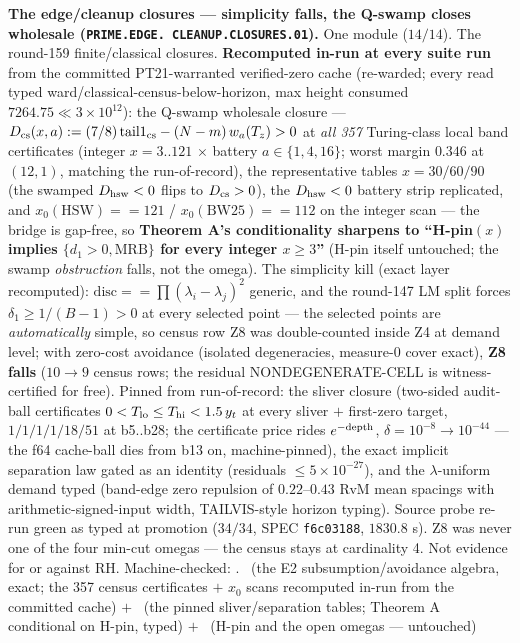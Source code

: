\par\smallskip\noindent\textbf{The edge/cleanup closures ---
simplicity falls, the Q-swamp closes wholesale
(\texttt{PRIME.\allowbreak EDGE.\allowbreak
CLEANUP.\allowbreak CLOSURES.01}).}
One module ($14/14$).  The round-159 finite/classical closures.
\textbf{Recomputed in-run at every suite run} from the committed
PT21-warranted verified-zero cache (re-warded; every read typed
ward/classical-census-below-horizon, max height consumed
$7264.75 \ll 3\times10^{12}$): the Q-swamp wholesale closure ---
$D_{\rm cs}(x, a) := (7/8)\,\mathrm{tail1}_{\rm cs} - (N -
m)\,w_a(T_z) > 0$ at \emph{all 357} Turing-class local band
certificates (integer $x = 3..121$ $\times$ battery $a \in \{1,
4, 16\}$; worst margin $0.346$ at $(12, 1)$, matching the
run-of-record), the representative tables $x = 30/60/90$ (the
swamped $D_{\rm hsw} < 0$ flips to $D_{\rm cs} > 0$), the
$D_{\rm hsw} < 0$ battery strip replicated, and $x_0(\mathrm{HSW})
== 121$ / $x_0(\mathrm{BW25}) == 112$ on the integer scan ---
the bridge is gap-free, so \textbf{Theorem A's conditionality
sharpens to ``H-pin$(x)$ implies $\{d_1 > 0, \mathrm{MRB}\}$ for
every integer $x \ge 3$''} (H-pin itself untouched; the swamp
\emph{obstruction} falls, not the omega).  The simplicity kill
(exact layer recomputed): $\mathrm{disc} == \prod(\lambda_i -
\lambda_j)^2$ generic, and the round-147 LM split forces
$\delta_1 \ge 1/(B-1) > 0$ at every selected point --- the
selected points are \emph{automatically} simple, so census row
Z8 was double-counted inside Z4 at demand level; with zero-cost
avoidance (isolated degeneracies, measure-0 cover exact),
\textbf{Z8 falls} ($10 \to 9$ census rows; the residual
NONDEGENERATE-CELL is witness-certified for free).  Pinned from
run-of-record: the sliver closure (two-sided audit-ball
certificates $0 < T_{\rm lo} \le T_{\rm hi} < 1.5\,y_t$ at every
sliver $+$ first-zero target, $1/1/1/1/18/51$ at b5..b28; the
certificate price rides $e^{-\rm depth}$, $\delta = 10^{-8} \to
10^{-44}$ --- the f64 cache-ball dies from b13 on,
machine-pinned), the exact implicit separation law gated as an
identity (residuals $\le 5\times10^{-27}$), and the
$\lambda$-uniform demand typed (band-edge zero repulsion of
$0.22$--$0.43$ RvM mean spacings with arithmetic-signed-input
width, TAILVIS-style horizon typing).  Source probe re-run green
as typed at promotion ($34/34$, SPEC \texttt{f6c03188},
$1830.8$ s).  Z8 was never one of the four min-cut omegas ---
the census stays at cardinality 4.  Not evidence for or against
RH.
Machine-checked: .
\mE\ (the E2 subsumption/avoidance algebra, exact; the 357
census certificates $+$ $x_0$ scans recomputed in-run from the
committed cache) $+$ \mC\ (the pinned sliver/separation tables;
Theorem A conditional on H-pin, typed) $+$ \mO\ (H-pin and the
open omegas --- untouched)
\par\smallskip



